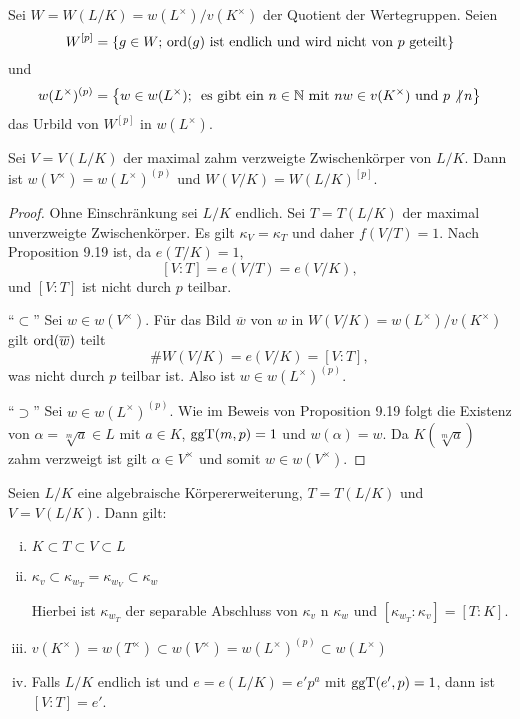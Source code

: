 \begin{defi}
	Sei $W=W(L/K)= w(L^\times) / v(K^\times)$ der Quotient der Wertegruppen. Seien
	\[ W^{[p]} = \left\{ g \in W; \, \operatorname{ord}(g) \text{ ist endlich und wird nicht von $p$ geteilt}   \right\}
	\]
	und
	\[ w(L^\times)^{(p)} = \left\{  w \in w(L^\times); \, \text{ es gibt ein $n\in\mathbb{N}$ mit $nw \in v(K^\times)$ und $p\not| \, n$} \right\}
	\]
	das Urbild von $W^{[p]}$ in $w(L^\times)$.
\end{defi}

\begin{Prop}
	Sei $V=V(L/K)$ der maximal zahm verzweigte Zwischenkörper von $L/K$. Dann ist 
	$w(V^\times)=w(L^\times)^{(p)}$ und $W(V/K) = W(L/K)^{[p]}$.
\end{Prop}

\begin{proof}
	Ohne Einschränkung sei $L/K$ endlich. Sei $T=T(L/K)$ der maximal unverzweigte Zwischenkörper. Es gilt $\kappa_V = \kappa_T$ und daher $f(V/T)=1$. Nach Proposition 9.19 ist, da $e(T/K)=1$,
	\[ [V:T] = e(V/T) = e(V/K),
	\]
	und $[V:T]$ ist nicht durch $p$ teilbar.
	
	\bigskip \enquote{$\subset$} Sei $w \in w(V^\times)$. Für das Bild $\overline{w}$ von $w$ in
	$W(V/K)= w(L^\times) / v(K^\times)$ gilt $\operatorname{ord}(\overline{w})$ teilt
	\[ \# W(V/K) = e(V/K) = [V:T],
	\]
	was nicht durch $p$ teilbar ist. Also ist $w \in w(L^\times)^{(p)}$.
	
	\bigskip \enquote{$\supset$} Sei $w \in w(L^\times)^{(p)}$. Wie im Beweis von Proposition 9.19 folgt die Existenz von $\alpha = \sqrt[m]{a} \in L$ mit $a\in K$, $\operatorname{ggT}(m,p) = 1$ und $w(\alpha) = w$. Da $K\left( \sqrt[m]{a} \right)$ zahm verzweigt ist gilt $\alpha \in V^\times$ und somit $w\in w(V^\times)$.
\end{proof}


\begin{Kor}
	Seien $L/K$ eine algebraische Körpererweiterung, $T=T(L/K)$ und $V=V(L/K)$. Dann gilt:
	\begin{enumerate}[(i)]
		\item $K \subset T \subset V \subset L$
		\item $\kappa_v \subset \kappa_{w_T} = \kappa_{w_V} \subset \kappa_w$
		
		Hierbei ist $\kappa_{w_T}$ der separable Abschluss von $\kappa_v$ n $\kappa_w$ und 
		$[\kappa_{w_T}: \kappa_v] = [T:K]$.
		\item $v(K^\times) = w(T^\times) \subset w(V^\times) 
		= w(L^\times)^{(p)} \subset w(L^\times)$
		\item Falls $L/K$ endlich ist und $e=e(L/K)=e'p^a$ mit $\operatorname{ggT}(e',p)=1$, dann ist $[V:T] = e'$.
	\end{enumerate}
\end{Kor}

